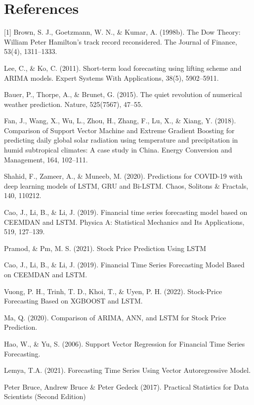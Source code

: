 \documentclass{ieeeojies}
\begin{document}
\section{References}

[1] Brown, S. J., Goetzmann, W. N., \& Kumar, A. (1998b). The Dow Theory: William Peter Hamilton’s track record reconsidered. The Journal of Finance, 53(4), 1311–1333. 

\noindent[2] Lee, C., \& Ko, C. (2011). Short-term load forecasting using lifting scheme and ARIMA models. Expert Systems With Applications, 38(5), 5902–5911.

\noindent[3] Bauer, P., Thorpe, A., \& Brunet, G. (2015). The quiet revolution of numerical weather prediction. Nature, 525(7567), 47–55.

\noindent[4] Fan, J., Wang, X., Wu, L., Zhou, H., Zhang, F., Lu, X., \& Xiang, Y. (2018). Comparison of Support Vector Machine and Extreme Gradient Boosting for predicting daily global solar radiation using temperature and precipitation in humid subtropical climates: A case study in China. Energy Conversion and Management, 164, 102–111. 

\noindent[5] Shahid, F., Zameer, A., \& Muneeb, M. (2020). Predictions for COVID-19 with deep learning models of LSTM, GRU and Bi-LSTM. Chaos, Solitons \& Fractals, 140, 110212. 

\noindent[6] Cao, J., Li, B., \& Li, J. (2019). Financial time series forecasting model based on CEEMDAN and LSTM. Physica A: Statistical Mechanics and Its Applications, 519, 127–139.

\noindent[7] Pramod, \& Pm, M. S. (2021). Stock Price Prediction Using LSTM

\noindent[8] Cao, J., Li, B., \& Li, J. (2019). Financial Time Series Forecasting Model Based on CEEMDAN and LSTM.

\noindent[9] Vuong, P. H., Trinh, T. D., Khoi, T., \& Uyen, P. H. (2022). Stock-Price Forecasting Based on XGBOOST and LSTM.

\noindent[10] Ma, Q. (2020). Comparison of ARIMA, ANN, and LSTM for Stock Price Prediction.

\noindent[11] Hao, W., \& Yu, S. (2006). Support Vector Regression for Financial Time Series Forecasting.

\noindent[12] Lemya, T.A. (2021). Forecasting Time Series Using Vector Autoregressive Model.

\noindent[13] Peter Bruce, Andrew Bruce \& Peter Gedeck (2017). Practical Statistics for Data Scientists (Second Edition)
\end{document}
